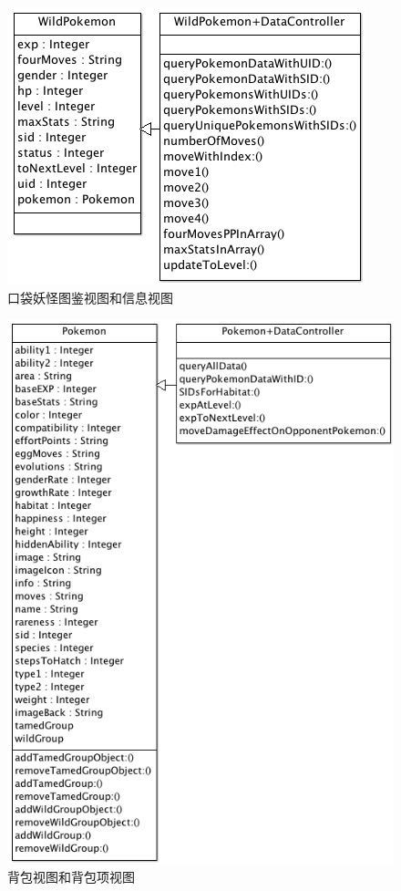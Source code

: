 \documentclass{article}
\begin{document}
\begin{CJK}{UTF8}{gbsn}
  \begin{figure}[htbp]
		\centering
		\includegraphics[bb=0 0 548 341, scale=0.45]{figure/fig_n14.png}
		\caption{口袋妖怪图鉴视图和信息视图}
		\label{fig:n14}
	\end{figure}

  \begin{figure}[htbp]
		\centering
		\includegraphics[bb=0 0 548 341, scale=0.45]{figure/fig_n15.png}
		\caption{背包视图和背包项视图}
		\label{fig:n15}
	\end{figure}


\end{CJK}
\end{document}
